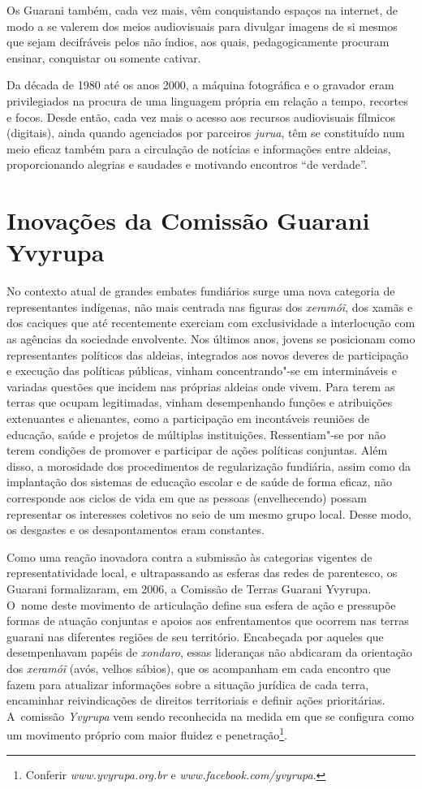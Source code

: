 Os Guarani também, cada vez mais, vêm conquistando espaços na internet,
de modo a se valerem dos meios audiovisuais para divulgar imagens de si
mesmos que sejam decifráveis pelos não índios, aos quais,
pedagogicamente procuram ensinar, conquistar ou somente cativar. 

Da década de 1980 até os anos 2000, a máquina fotográfica e o gravador
eram privilegiados na procura de uma linguagem própria em relação a
tempo, recortes e focos. Desde então, cada vez mais o acesso aos
recursos audiovisuais fílmicos (digitais), ainda quando agenciados por
parceiros \emph{jurua}, têm se constituído num meio eficaz também para a
circulação de notícias e informações entre aldeias, proporcionando
alegrias e saudades e motivando encontros ``de verdade''.

\section{Inovações da Comissão Guarani Yvyrupa}

No contexto atual de grandes embates fundiários surge uma nova categoria
de representantes indígenas, não mais centrada nas figuras dos
\emph{xeramóĩ}, dos xamãs e dos caciques que até
recentemente exerciam com exclusividade a interlocução com as agências
da sociedade envolvente. Nos últimos anos, jovens se posicionam como
representantes políticos das aldeias, integrados aos novos deveres de
participação e execução das políticas públicas, vinham concentrando"-se
em intermináveis e variadas questões que incidem nas próprias aldeias
onde vivem. Para terem as terras que ocupam legitimadas, vinham
desempenhando funções e atribuições extenuantes e alienantes, como a
participação em incontáveis reuniões de educação, saúde e projetos de
múltiplas instituições. Ressentiam"-se por não terem condições de
promover e participar de ações políticas conjuntas. Além disso, a
morosidade dos procedimentos de regularização fundiária, assim como da
implantação dos sistemas de educação escolar e de saúde de forma
eficaz, não corresponde aos ciclos de vida em que as pessoas
(envelhecendo) possam representar os interesses coletivos no seio de um
mesmo grupo local. Desse modo, os desgastes e os desapontamentos eram
constantes. 

Como uma reação inovadora contra a submissão às categorias vigentes de
representatividade local, e ultrapassando as esferas das redes de
parentesco, os Guarani formalizaram, em 2006, a Comissão de Terras
Guarani Yvyrupa. O~nome deste movimento de articulação define sua
esfera de ação e pressupõe formas de atuação conjuntas e apoios aos
enfrentamentos que ocorrem nas terras guarani nas diferentes regiões de
seu território. Encabeçada por aqueles que desempenhavam papéis de
\emph{xondaro}, essas lideranças não abdicaram da orientação dos
\emph{xeramóĩ} (avós, velhos sábios), que os acompanham
em cada encontro que fazem para atualizar informações sobre a situação
jurídica de cada terra, encaminhar reivindicações de direitos
territoriais e definir ações prioritárias. A~comissão \emph{Yvyrupa} vem sendo
reconhecida na medida em que se configura como um movimento próprio com
maior fluidez e penetração\footnote{Conferir \emph{www.yvyrupa.org.br} e
\emph{www.facebook.com/yvyrupa}.}. 

